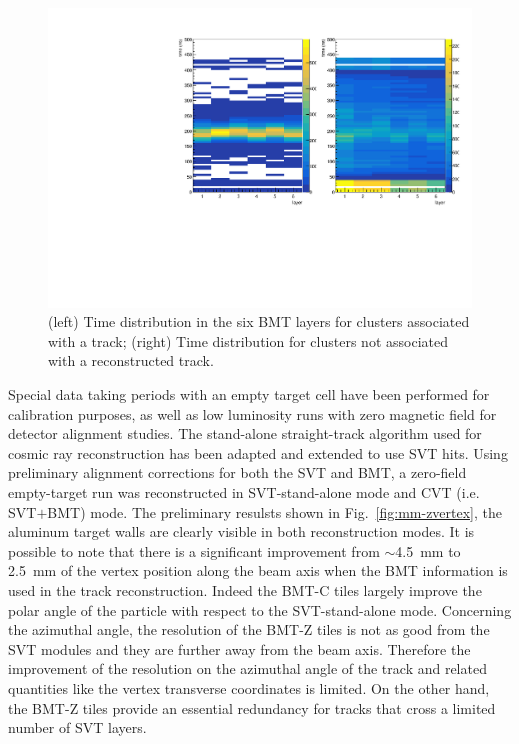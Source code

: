 \begin{figure}[htb]
 \includegraphics[width=\columnwidth,keepaspectratio]{images/align_cls_time.pdf}
 \caption{(left) Time distribution in the six BMT layers for clusters associated with a track; (right) Time distribution for clusters
   not associated with a reconstructed track.}
 \label{fig:mm-beam_cls_time}
\end{figure}

Special data taking periods with an empty target cell have been performed for calibration purposes, as well as low luminosity runs
with zero magnetic field for detector alignment studies. The stand-alone straight-track algorithm used for cosmic ray
reconstruction has been adapted and extended to use SVT hits. Using preliminary alignment corrections for both the SVT and
BMT, a zero-field empty-target run was reconstructed in SVT-stand-alone mode and CVT (i.e. SVT$+$BMT) mode. The 
preliminary resulsts shown in Fig.~\ref{fig:mm-zvertex}, the aluminum target walls are clearly visible in both 
reconstruction modes. It is possible to note that there is a significant improvement from $\sim$4.5~mm to 2.5~mm of the 
vertex position along the beam axis when the BMT information is used in the track reconstruction. Indeed the BMT-C tiles 
largely improve the polar angle of the particle with respect to the SVT-stand-alone mode. Concerning the azimuthal 
angle, the resolution of the BMT-Z tiles is not as good from the SVT modules and they are further away from the beam 
axis. Therefore the improvement of the resolution on the azimuthal angle of the track and related quantities like the 
vertex transverse coordinates is limited. On the other hand, the BMT-Z tiles provide an essential redundancy for tracks that 
cross a limited number of SVT layers.

